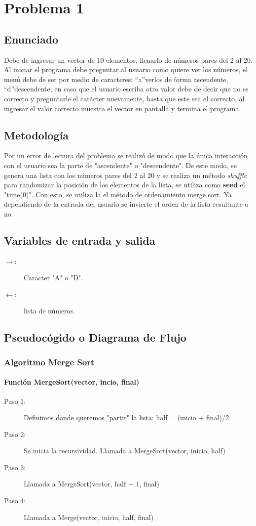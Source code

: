 \section{Problema 1}
\subsection{Enunciado}
Debe de ingresar un vector de 10 elementos, llenarlo de números pares del 2 al 20. Al iniciar el
programa debe preguntar al usuario como quiere ver los números, el menú debe de ser por medio de
caracteres: “a”verlos de forma ascendente, “d”descendente, en caso que el usuario escriba otro valor
debe de decir que no es correcto y preguntarle el carácter nuevamente, hasta que este sea el correcto,
al ingresar el valor correcto muestra el vector en pantalla y termina el programa.

\subsection{Metodología}
Por un error de lectura del problema se realizó de modo que la única interacción con el usuario sea la parte de "ascendente" o "descendente". De este modo, se genera una lista con los números pares del $2$ al $20$ y se realiza un método \textit{shuffle} para randomizar la posición de los elementos de la lista, se utiliza como \textbf{seed} el "time(0)". Con esto, se utiliza la el método de ordenamiento merge sort. Ya dependiendo de la entrada del usuario se invierte el orden de la lista resultante o no.

\subsection{Variables de entrada y salida}
\begin{description}
	\item[$\rightarrow$: ] Caracter "A" o "D".
	\item[$\leftarrow$: ] lista de números. 
\end{description}

\subsection{Pseudocógido o Diagrama de Flujo}
\subsubsection{Algoritmo Merge Sort}
\paragraph{Función MergeSort(vector, incio, final)}
\begin{description}
	\item[Paso 1: ] Definimos donde queremos "partir" la lista: half = (inicio + final)$/2$
	\item[Paso 2: ] Se inicia la recursividad. Llamada a MergeSort(vector, inicio, half)
	\item[Paso 3: ] Llamada a MergeSort(vector, half $+$ 1, final)
	\item[Paso 4: ] Llamada a Merge(vector, inicio, half, final)
\end{description}

